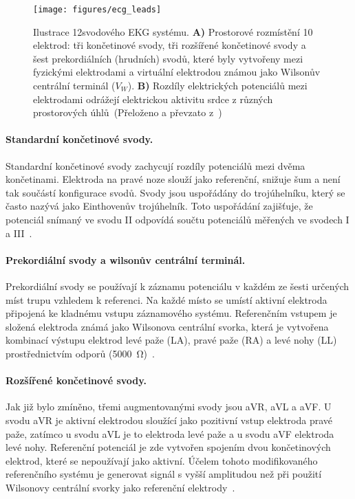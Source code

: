 \begin{figure}[htb!]
    \begin{center}
        \texttt{[image: figures/ecg\_leads]}
        \caption{Ilustrace 12svodového EKG systému. \textbf{A)} Prostorové
            rozmístění 10 elektrod: tři končetinové svody, tři rozšířené končetinové
            svody a šest prekordiálních (hrudních) svodů, které byly vytvořeny mezi
            fyzickými elektrodami a virtuální elektrodou známou jako Wilsonův
            centrální terminál ($V_W$). \textbf{B)} Rozdíly elektrických potenciálů
            mezi elektrodami odrážejí elektrickou aktivitu srdce z různých
            prostorových úhlů~(Přeloženo a převzato z~\cite{Yao2020})}
        \label{fig:ecg_leads}
    \end{center}
\end{figure}

\paragraph{Standardní končetinové svody.}
Standardní končetinové svody zachycují rozdíly potenciálů mezi dvěma
končetinami. Elektroda na pravé noze slouží jako referenční, snižuje šum a není
tak součástí konfigurace svodů. Svody jsou uspořádány do trojúhelníku, který se
často nazývá jako Einthovenův trojúhelník. Toto uspořádání zajišťuje, že
potenciál snímaný ve svodu II odpovídá součtu potenciálů měřených ve svodech I a
III~\cite{Goldberger2017,mirvis2001}.

\paragraph{Prekordiální svody a wilsonův centrální terminál.}
Prekordiální svody se používají k záznamu potenciálu v každém ze šesti určených
míst trupu vzhledem k referenci. Na každé místo se umístí aktivní elektroda
připojená ke kladnému vstupu záznamového systému. Referenčním vstupem je složená
elektroda známá jako Wilsonova centrální svorka, která je vytvořena kombinací
výstupu elektrod levé paže (LA), pravé paže (RA) a levé nohy (LL)
prostřednictvím odporů (5000~\si{\ohm})~\cite{Goldberger2017,mirvis2001}.

\paragraph{Rozšířené končetinové svody.}
Jak již bylo zmíněno, třemi augmentovanými svody jsou aVR, aVL a aVF. U svodu
aVR je aktivní elektrodou sloužící jako pozitivní vstup elektroda pravé paže,
zatímco u svodu aVL je to elektroda levé paže a u svodu aVF elektroda levé nohy.
Referenční potenciál je zde vytvořen spojením dvou končetinových elektrod, které
se nepoužívají jako aktivní. Účelem tohoto modifikovaného referenčního systému
je generovat signál s vyšší amplitudou než při použití Wilsonovy centrální
svorky jako referenční elektrody~\cite{Goldberger2017,mirvis2001}.

